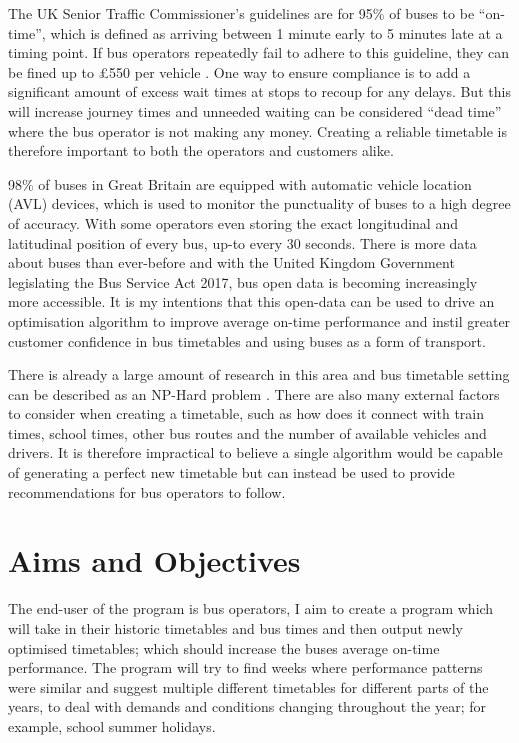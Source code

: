 \documentclass[]{report}
\begin{document}
\vspace{0.5cm}
The UK Senior Traffic Commissioner’s guidelines are for 95\% of buses to be “on-time”, which is defined as arriving between 1 minute early to 5 minutes late at a timing point\cite{RN14}. If bus operators repeatedly fail to adhere to this guideline, they can be fined up to £550 per vehicle \cite{RN14}. One way to ensure compliance is to add a significant amount of excess wait times at stops to recoup for any delays. But this will increase journey times and unneeded waiting can be considered “dead time” where the bus operator is not making any money. Creating a reliable timetable is therefore important to both the operators and customers alike.


\vspace{0.5cm}
98\% of buses in Great Britain are equipped with automatic vehicle location (AVL) devices\cite{RN12}, which is used to monitor the punctuality of buses to a high degree of accuracy. With some operators even storing the exact longitudinal and latitudinal position of every bus, up-to every 30 seconds. There is more data about buses than ever-before and with the United Kingdom Government legislating the Bus Service Act 2017\cite{RN13}, bus open data is becoming increasingly more accessible. It is my intentions that this open-data can be used to drive an optimisation algorithm to improve average on-time performance and instil greater customer confidence in bus timetables and using buses as a form of transport.


\vspace{0.5cm}
There is already a large amount of research in this area and bus timetable setting can be described as an NP-Hard problem \cite{RN15}. There are also many external factors to consider when creating a timetable, such as how does it connect with train times, school times, other bus routes and the number of available vehicles and drivers. It is therefore impractical to believe a single algorithm would be capable of generating a perfect new timetable but can instead be used to provide recommendations for bus operators to follow.


\section*{Aims and Objectives}


The end-user of the program is bus operators, I aim to create a program which will take in their historic timetables and bus times and then output newly optimised timetables; which should increase the buses average on-time performance. The program will try to find weeks where performance patterns were similar and suggest multiple different timetables for different parts of the years, to deal with demands and conditions changing throughout the year; for example, school summer holidays. 
\end{document}
